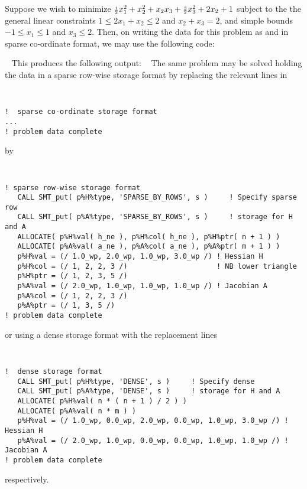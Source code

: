 \documentclass{galahad}
\begin{document}
\galexample
Suppose we wish to minimize
${\scriptstyle \frac{1}{2}} x_1^2 + x_2^2 + x_2 x_3 + {\scriptstyle \frac{3}{2}} x_3^2 + 2 x_2 + 1$
subject to the the general linear constraints
$1 \leq  2 x_{1}  +  x_{2}  \leq  2$ and
$x_{2}  +  x_{3}  =  2$, and simple bounds
$-1  \leq  x_{1}  \leq  1$ and $x_{3}  \leq  2$.
Then, on writing the data for this problem as
and
in sparse co-ordinate format, we may use the following code:

{\tt \small
\VerbatimInput{\packageexample}
}
\noindent
This produces the following output:
{\tt \small
\VerbatimInput{\packageresults}
}
\noindent
The same problem may be solved holding the data in
a sparse row-wise storage format by replacing the relevant lines in
{\tt \small
\begin{verbatim}
!  sparse co-ordinate storage format
...
! problem data complete
\end{verbatim}
}
\noindent
by
{\tt \small
\begin{verbatim}
! sparse row-wise storage format
   CALL SMT_put( p%H%type, 'SPARSE_BY_ROWS', s )     ! Specify sparse row
   CALL SMT_put( p%A%type, 'SPARSE_BY_ROWS', s )     ! storage for H and A
   ALLOCATE( p%H%val( h_ne ), p%H%col( h_ne ), p%H%ptr( n + 1 ) )
   ALLOCATE( p%A%val( a_ne ), p%A%col( a_ne ), p%A%ptr( m + 1 ) )
   p%H%val = (/ 1.0_wp, 2.0_wp, 1.0_wp, 3.0_wp /) ! Hessian H
   p%H%col = (/ 1, 2, 2, 3 /)                     ! NB lower triangle
   p%H%ptr = (/ 1, 2, 3, 5 /)
   p%A%val = (/ 2.0_wp, 1.0_wp, 1.0_wp, 1.0_wp /) ! Jacobian A
   p%A%col = (/ 1, 2, 2, 3 /)
   p%A%ptr = (/ 1, 3, 5 /)
! problem data complete
\end{verbatim}
}
\noindent
or using a dense storage format with the replacement lines
{\tt \small
\begin{verbatim}
!  dense storage format
   CALL SMT_put( p%H%type, 'DENSE', s )     ! Specify dense
   CALL SMT_put( p%A%type, 'DENSE', s )     ! storage for H and A
   ALLOCATE( p%H%val( n * ( n + 1 ) / 2 ) )
   ALLOCATE( p%A%val( n * m ) )
   p%H%val = (/ 1.0_wp, 0.0_wp, 2.0_wp, 0.0_wp, 1.0_wp, 3.0_wp /) ! Hessian H
   p%A%val = (/ 2.0_wp, 1.0_wp, 0.0_wp, 0.0_wp, 1.0_wp, 1.0_wp /) ! Jacobian A
! problem data complete
\end{verbatim}
}
\noindent
respectively.
\end{document}
